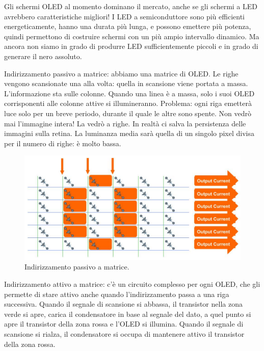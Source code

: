 \documentclass[a4paper,11pt]{article}
\begin{document}
Gli schermi OLED al momento dominano il mercato, anche se gli schermi a LED avrebbero caratteristiche migliori! I LED a semiconduttore sono
più efficienti energeticamente, hanno una durata più lunga, e possono emettere più potenza, quindi permettono di costruire schermi con un più ampio intervallo dinamico. Ma ancora
non siamo in grado di produrre LED sufficientemente piccoli e in grado di generare il nero assoluto.
\par
Indirizzamento passivo a matrice: abbiamo una matrice di OLED. Le righe vengono scansionate
una alla volta: quella in scansione viene portata a massa. L'informazione sta sulle colonne. Quando una linea è a massa,
solo i suoi OLED corrisponenti alle colonne attive si illumineranno. Problema: ogni riga emetterà luce solo per un breve periodo,
durante il quale le altre sono spente. Non vedrò mai l'immagine intera! La vedrò a righe. In realtà ci salva
la persistenza delle immagini sulla retina. La luminanza media sarà quella di un singolo pixel divisa per il numero di righe: è molto bassa.

\renewcommand{\thefigure}{4.16}
\begin{figure}[!h]
  \centering
    \includegraphics[scale=0.24]{images/4/pmoled.png}
    \caption{Indirizzamento passivo a matrice.}
\end{figure}

Indirizzamento attivo a matrice: c'è un circuito complesso per ogni OLED, che gli permette di stare attivo anche
quando l'indirizzamento passa a una riga successiva. Quando il segnale di scansione si abbassa, il transistor nella zona verde
si apre, carica il condensatore in base al segnale del dato, a quel punto si apre il transistor della zona rossa e l'OLED
si illumina. Quando il segnale di scansione si rialza, il condensatore si occupa di mantenere attivo il transistor della zona rossa.
\end{document}
